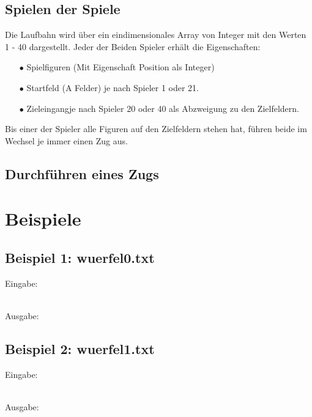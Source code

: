 \documentclass[a4paper,11pt,ngerman]{scrartcl}
\begin{document}
\subsection{Spielen der \glqq Spiele\grqq}
Die Laufbahn wird über ein eindimensionales Array von Integer mit den Werten 1 - 40 dargestellt. Jeder der Beiden Spieler erhält die Eigenschaften:
\begin{enumerate}
	\item[$\bullet$] Spielfiguren (Mit Eigenschaft Position als Integer)
	\item[$\bullet$] Startfeld (\glqq A Felder\grqq) je nach Spieler 1 oder 21.
	\item[$\bullet$] \glqq Zieleingang\grqq \space je nach Spieler 20 oder 40 als Abzweigung zu den Zielfeldern.	
\end{enumerate} 
Bis einer der Spieler alle Figuren auf den Zielfeldern stehen hat, führen beide im Wechsel je immer einen Zug aus.
\subsection{Durchführen eines Zugs}


 

\section{Beispiele}
\subsection{Beispiel 1: wuerfel0.txt}
Eingabe:
\begin{tcolorbox}[center,width=12cm,title=Textfiles/wuerfel0.txt]
	\centering
	
\end{tcolorbox}
\\ Ausgabe:
\centering
\begin{tcolorbox}[center,width=16cm,title=Textfiles/wuerfel0\_result.txt]
	
	
\end{tcolorbox}
\subsection{Beispiel 2: wuerfel1.txt}
Eingabe:
\begin{tcolorbox}[center,width=12cm,title=Textfiles/wuerfel1.txt]
	\centering
	
\end{tcolorbox}
\\ Ausgabe:
\centering
\begin{tcolorbox}[center,width=12cm,title=Textfiles/wuerfel1\_result.txt]
	
	
\end{tcolorbox}
\end{document}
